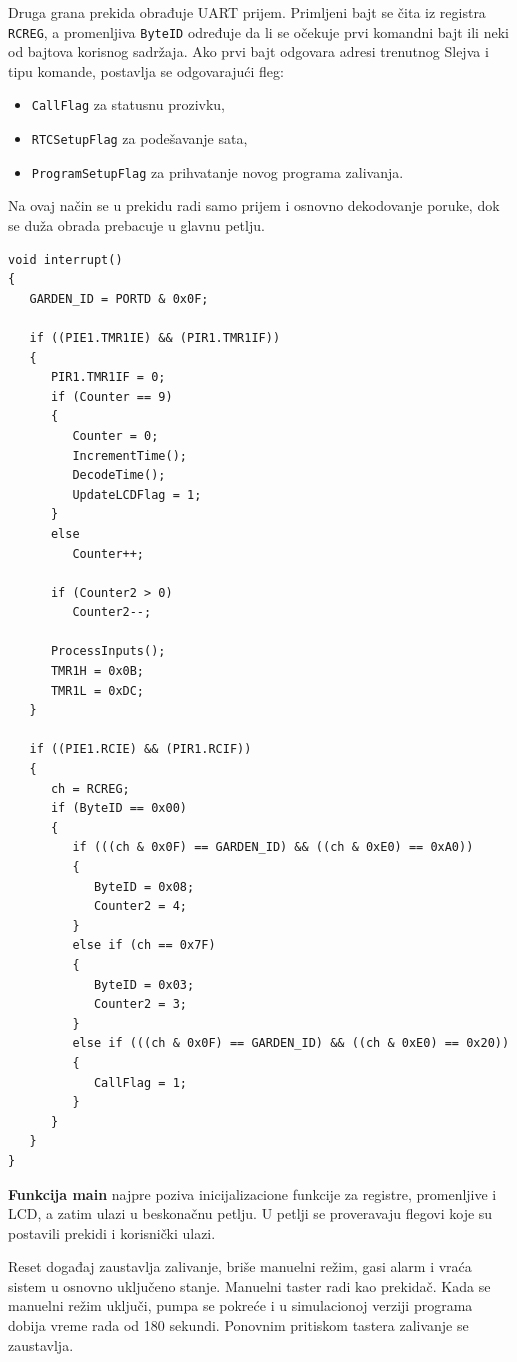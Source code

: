 \documentclass[12pt]{article}
\numberwithin{figure}{section}
\begin{document}
  Druga grana prekida obrađuje UART prijem. 
  Primljeni bajt se čita iz registra \texttt{RCREG}, a promenljiva \texttt{ByteID} određuje da li se očekuje prvi komandni bajt ili neki od bajtova korisnog sadržaja. 
  Ako prvi bajt odgovara adresi trenutnog Slejva i tipu komande, postavlja se odgovarajući fleg:
  \begin{itemize}
    \item{\texttt{CallFlag} za statusnu prozivku,}
    \item{\texttt{RTCSetupFlag} za podešavanje sata,}
    \item{\texttt{ProgramSetupFlag} za prihvatanje novog programa zalivanja.}
  \end{itemize}
  Na ovaj način se u prekidu radi samo prijem i osnovno dekodovanje poruke, dok se duža obrada prebacuje u glavnu petlju.
  \begin{verbatim}
void interrupt()
{
   GARDEN_ID = PORTD & 0x0F;

   if ((PIE1.TMR1IE) && (PIR1.TMR1IF))
   {
      PIR1.TMR1IF = 0;
      if (Counter == 9)
      {
         Counter = 0;
         IncrementTime();
         DecodeTime();
         UpdateLCDFlag = 1;
      }
      else
         Counter++;

      if (Counter2 > 0)
         Counter2--;

      ProcessInputs();
      TMR1H = 0x0B;
      TMR1L = 0xDC;
   }

   if ((PIE1.RCIE) && (PIR1.RCIF))
   {
      ch = RCREG;
      if (ByteID == 0x00)
      {
         if (((ch & 0x0F) == GARDEN_ID) && ((ch & 0xE0) == 0xA0))
         {
            ByteID = 0x08;
            Counter2 = 4;
         }
         else if (ch == 0x7F)
         {
            ByteID = 0x03;
            Counter2 = 3;
         }
         else if (((ch & 0x0F) == GARDEN_ID) && ((ch & 0xE0) == 0x20))
         {
            CallFlag = 1;
         }
      }
   }
}
  \end{verbatim}

  \textbf{Funkcija main} najpre poziva inicijalizacione funkcije za registre, promenljive i LCD, a zatim ulazi u beskonačnu petlju.
  U petlji se proveravaju flegovi koje su postavili prekidi i korisnički ulazi.

  Reset događaj zaustavlja zalivanje, briše manuelni režim, gasi alarm i vraća sistem u osnovno uključeno stanje. 
  Manuelni taster radi kao prekidač. 
  Kada se manuelni režim uključi, pumpa se pokreće i u simulacionoj verziji programa dobija vreme rada od 180 sekundi. 
  Ponovnim pritiskom tastera zalivanje se zaustavlja.
\end{document}
